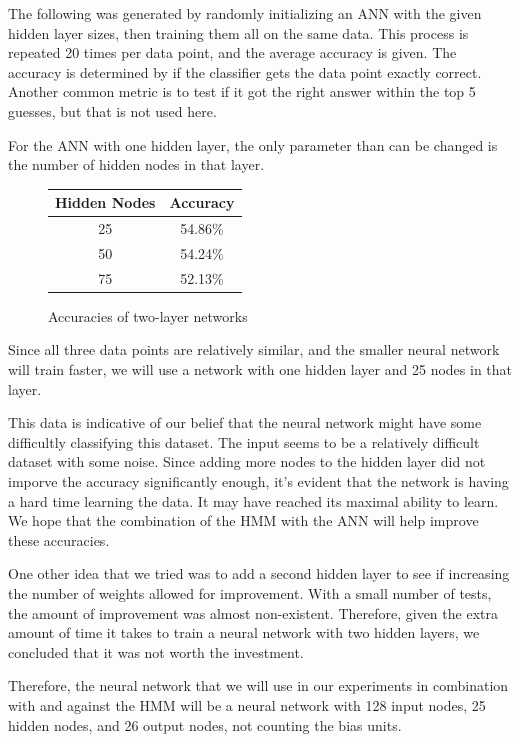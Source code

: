 \documentclass[11pt,a4paper,twocolumn]{article}
\begin{document}
The following was generated by randomly initializing an ANN with the given
hidden layer sizes, then training them all on the same data. This process is
repeated 20 times per data point, and the average accuracy is given. The
accuracy is determined by if the classifier gets the data point exactly
correct. Another common metric is to test if it got the right answer within the
top 5 guesses, but that is not used here.

For the ANN with one hidden layer, the only parameter than can be changed is the number of
hidden nodes in that layer.
\begin{figure}[h]
    \caption{Accuracies of two-layer networks}
    \centering
    \begin{tabular}{|c|c|}
        \hline 
        Hidden Nodes & Accuracy \\ 
        \hline 
        25 & 54.86\% \\ 
        \hline 
        50 & 54.24\% \\ 
        \hline 
        75 & 52.13\% \\ 
        \hline 
    \end{tabular} 
\end{figure}

Since all three data points are relatively similar, and the smaller neural
network will train faster, we will use a network with one hidden layer and 25 nodes
in that layer.

This data is indicative of our belief that the neural network might have some
difficultly classifying this dataset. The input seems to be a relatively
difficult dataset with some noise. Since adding more nodes to the hidden layer
did not imporve the accuracy significantly enough, it's evident that the
network is having a hard time learning the data. It may have reached its
maximal ability to learn. We hope that the combination of the HMM with the ANN
will help improve these accuracies.

One other idea that we tried was to add a second hidden layer to see if
increasing the number of weights allowed for improvement. With a small number
of tests, the amount of improvement was almost non-existent. Therefore, given
the extra amount of time it takes to train a neural network with two hidden
layers, we concluded that it was not worth the investment.

Therefore, the neural network that we will use in our experiments in
combination with and against the HMM will be a neural network with 128 input
nodes, 25 hidden nodes, and 26 output nodes, not counting the bias units.
\end{document}
